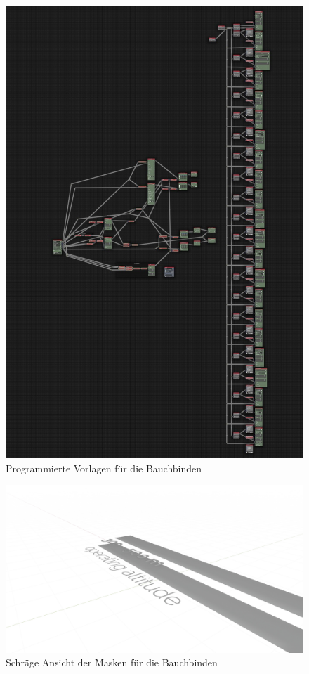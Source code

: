 \begin{figure}[H]
\begin{center}
\includegraphics[width=\textwidth]{gfx/post/call-out.jpg}
\caption{Programmierte Vorlagen für die Bauchbinden}
\label{out}
\end{center}
\end{figure}

\begin{figure}[H]
\begin{center}
\includegraphics[width=\textwidth]{gfx/post/call-out2.jpg}
\caption{Schräge Ansicht der Masken für die Bauchbinden}
\label{out2}
\end{center}
\end{figure}

